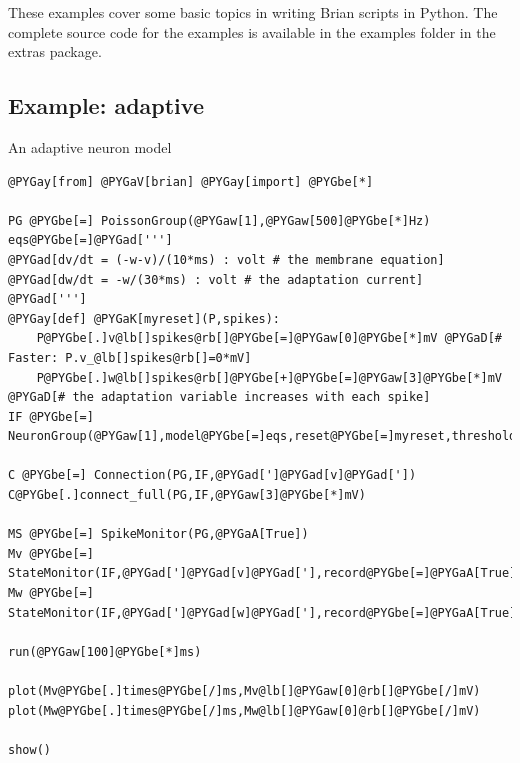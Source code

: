 \documentclass[letterpaper,10pt]{manual}
\begin{document}
These examples cover some basic topics in writing Brian scripts in Python. The
complete source code for the examples is available in the examples folder
in the extras package.

\resetcurrentobjects
{}

\hypertarget{index-26}{}\subsection{Example: adaptive}

An adaptive neuron model

\begin{Verbatim}[commandchars=@\[\]]
@PYGay[from] @PYGaV[brian] @PYGay[import] @PYGbe[*]

PG @PYGbe[=] PoissonGroup(@PYGaw[1],@PYGaw[500]@PYGbe[*]Hz)
eqs@PYGbe[=]@PYGad[''']
@PYGad[dv/dt = (-w-v)/(10*ms) : volt # the membrane equation]
@PYGad[dw/dt = -w/(30*ms) : volt # the adaptation current]
@PYGad[''']
@PYGay[def] @PYGaK[myreset](P,spikes):
    P@PYGbe[.]v@lb[]spikes@rb[]@PYGbe[=]@PYGaw[0]@PYGbe[*]mV @PYGaD[# Faster: P.v_@lb[]spikes@rb[]=0*mV]
    P@PYGbe[.]w@lb[]spikes@rb[]@PYGbe[+]@PYGbe[=]@PYGaw[3]@PYGbe[*]mV @PYGaD[# the adaptation variable increases with each spike]
IF @PYGbe[=] NeuronGroup(@PYGaw[1],model@PYGbe[=]eqs,reset@PYGbe[=]myreset,threshold@PYGbe[=]@PYGaw[20]@PYGbe[*]mV)

C @PYGbe[=] Connection(PG,IF,@PYGad[']@PYGad[v]@PYGad['])
C@PYGbe[.]connect_full(PG,IF,@PYGaw[3]@PYGbe[*]mV)

MS @PYGbe[=] SpikeMonitor(PG,@PYGaA[True])
Mv @PYGbe[=] StateMonitor(IF,@PYGad[']@PYGad[v]@PYGad['],record@PYGbe[=]@PYGaA[True])
Mw @PYGbe[=] StateMonitor(IF,@PYGad[']@PYGad[w]@PYGad['],record@PYGbe[=]@PYGaA[True])

run(@PYGaw[100]@PYGbe[*]ms)

plot(Mv@PYGbe[.]times@PYGbe[/]ms,Mv@lb[]@PYGaw[0]@rb[]@PYGbe[/]mV)
plot(Mw@PYGbe[.]times@PYGbe[/]ms,Mw@lb[]@PYGaw[0]@rb[]@PYGbe[/]mV)

show()
\end{Verbatim}

\resetcurrentobjects
{}
\end{document}
